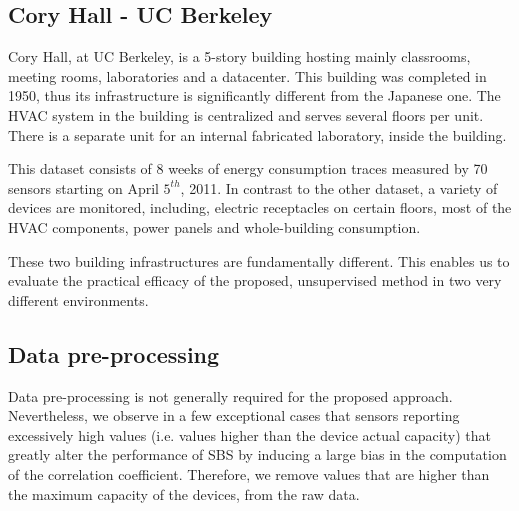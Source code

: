 
\subsection{Cory Hall - UC Berkeley}
Cory Hall, at UC Berkeley, is a 5-story building hosting mainly classrooms, meeting rooms, laboratories and a datacenter.
This building was completed in 1950, thus its infrastructure is significantly different from the Japanese one.
The HVAC system in the building is centralized and serves several floors per unit.
There is a separate unit for an internal fabricated laboratory, inside the building.

This dataset consists of 8 weeks of energy consumption traces measured by 70 sensors starting on April $5^{th}$, 2011.
In contrast to the other dataset, a variety of devices are monitored, including, electric receptacles on certain floors, most of the HVAC components, 
 power panels and whole-building consumption.

These two building infrastructures are fundamentally different.  
This enables us to evaluate the practical efficacy of the proposed, unsupervised method in two very different environments.


\subsection{Data pre-processing}
Data pre-processing is not generally required for the proposed approach.  
Nevertheless, we observe in a few exceptional cases that sensors reporting excessively high values (i.e. values higher than the device actual capacity) that  greatly alter the performance of SBS by inducing a large bias in the computation of the correlation coefficient.
Therefore, we remove values that are higher than the maximum capacity of the devices, from the raw data.



